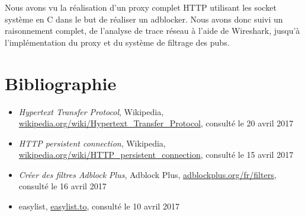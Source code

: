 \documentclass[a4paper,11pt, oneside]{book}
\begin{document}
			 Nous avons vu la réalisation d'un proxy complet HTTP utilisant les socket système en C dans le but de réaliser un adblocker.
			 Nous avons donc suivi un raisonnement complet, de l'analyse de trace réseau à l'aide de Wireshark, jusqu'à l'implémentation
			 du proxy et du système de filtrage des pubs.


			\chapter{Bibliographie}
			\begin{itemize}
				\item \textit{Hypertext Transfer Protocol}, Wikipedia, \\\href{https://en.wikipedia.org/wiki/Hypertext\_Transfer\_Protocol}
				{wikipedia.org/wiki/Hypertext\_Transfer\_Protocol}, consulté le 20 avril 2017

				\item \textit{HTTP persistent connection}, Wikipedia, \\\href{https://en.wikipedia.org/wiki/HTTP\_persistent\_connection}
				{wikipedia.org/wiki/HTTP\_persistent\_connection}, consulté le 15 avril 2017

				\item \textit{Créer des filtres Adblock Plus}, Adblock Plus, \href{https://adblockplus.org/fr/filters}{adblockplus.org/fr/filters}, consulté le 16 avril 2017
				\item easylist, \href{https://easylist.to/}{easylist.to}, consulté le 10 avril 2017
			\end{itemize}
\end{document}
